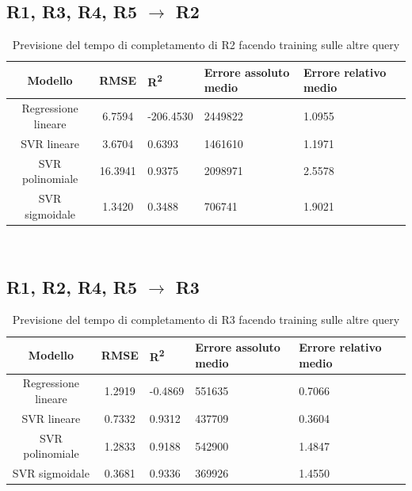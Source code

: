 \documentclass[a4paper,11pt]{article}
\begin{document}
\subsection{R1, R3, R4, R5 $\rightarrow$ R2}
\begin{table}[H]
	\centering
	\begin{adjustbox}{center}
		\begin{tabular}{c | c M{1.6cm} M{2.5cm} M{2.5cm} M{1.8cm}}
			Modello & RMSE & R\textsuperscript{2} & Errore assoluto medio & Errore relativo medio \tabularnewline
			\hline
			Regressione lineare & 6.7594 & -206.4530 & 2449822 & 1.0955 \\
			SVR lineare & 3.6704 & 0.6393 & 1461610 & 1.1971 \\
			SVR polinomiale & 16.3941 & 0.9375 & 2098971 & 2.5578 \\
			SVR sigmoidale & 1.3420 & 0.3488 & 706741 & 1.9021 \\
		\end{tabular}
	\end{adjustbox}
	\\
	\caption{Previsione del tempo di completamento di R2 facendo training sulle altre query}
	\label{table_R2_prediction_all}
\end{table}

\subsection{R1, R2, R4, R5 $\rightarrow$ R3}
\begin{table}[H]
	\centering
	\begin{adjustbox}{center}
		\begin{tabular}{c | c M{1.3cm} M{2.5cm} M{2.5cm} M{1.8cm}}
			Modello & RMSE & R\textsuperscript{2} & Errore assoluto medio & Errore relativo medio \tabularnewline
			\hline
			Regressione lineare & 1.2919 & -0.4869 & 551635 & 0.7066 \\
			SVR lineare & 0.7332 & 0.9312 & 437709 & 0.3604 \\
			SVR polinomiale & 1.2833 & 0.9188 & 542900 & 1.4847 \\
			SVR sigmoidale & 0.3681 & 0.9336 & 369926 & 1.4550 \\
		\end{tabular}
	\end{adjustbox}
	\\
	\caption{Previsione del tempo di completamento di R3 facendo training sulle altre query}
	\label{table_R3_prediction_all}
\end{table}
\end{document}
